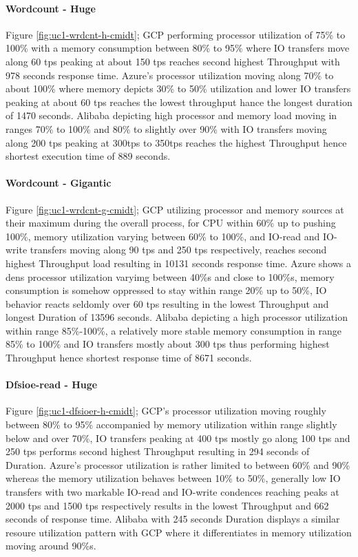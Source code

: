 \documentclass[review]{elsarticle}
\begin{document}
\paragraph{Wordcount - Huge} Figure \ref{fig:uc1-wrdcnt-h-cmidt}; GCP performing processor utilization of 75\% to 100\% with a memory consumption between 80\% to 95\% where IO transfers move along 60 tps peaking at about 150 tps reaches second highest Throughput with 978 seconds response time. Azure's processor utilization moving along 70\% to about 100\% where memory depicts 30\% to 50\% utilization and lower IO transfers peaking at about 60 tps reaches the lowest throughput hance the longest duration of 1470 seconds. Alibaba depicting high processor and memory load moving in ranges 70\% to 100\% and 80\% to slightly over 90\% with IO transfers moving along 200 tps peaking at 300tps to 350tps reaches the highest Throughput hence shortest execution time of 889 seconds.

\paragraph{Wordcount - Gigantic} Figure \ref{fig:uc1-wrdcnt-g-cmidt}; GCP utilizing processor and memory sources at their maximum during the overall process, for CPU within 60\% up to pushing 100\%, memory utilization varying between 60\% to 100\%, and IO-read and IO-write transfers moving along 90 tps and 250 tps respectively, reaches second highest Throughput load resulting in 10131 seconds response time. Azure shows a dens processor utilization varyimg between 40\%s and close to 100\%s, memory consumption is somehow oppressed to stay within range 20\% up to 50\%, IO behavior reacts seldomly over 60 tps resulting in the lowest Throughput and longest Duration of 13596 seconds. Alibaba depicting a high processor utilization within range 85\%-100\%, a relatively more stable memory consumption in range 85\% to 100\% and IO transfers mostly about 300 tps thus performing highest Throughput hence shortest response time of 8671 seconds.

\paragraph{Dfsioe-read - Huge} Figure \ref{fig:uc1-dfsioer-h-cmidt}; GCP's processor utilization moving roughly between 80\% to 95\% accompanied by memory utilization  within range slightly below and over 70\%, IO transfers peaking at 400 tps mostly go along 100 tps and 250 tps performs second highest Throughput resulting in 294 seconds of Duration. Azure's processor utilization is rather limited to between 60\% and 90\% whereas the memory utilization behaves between 10\% to 50\%, generally low IO transfers with two markable IO-read and IO-write condences reaching peaks at 2000 tps and 1500 tps respectively results in the lowest Throughput and 662 seconds of response time. Alibaba with 245 seconds Duration displays a similar resoure utilization pattern with GCP where it differentiates in memory utilization moving around 90\%s.
\end{document}
